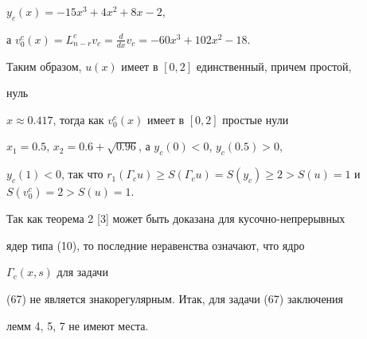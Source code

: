 $y_c(x)=-15x^3+4x^2+8x-2$, 


а $v^c_0(x)=L^c_{n-r}v_c=\frac{d}{dx}v_c=-60x^3+102x^2-18$. 


Таким образом, $u(x)$ имеет в $[0,2]$ единственный, причем простой, 


нуль 


$x\approx0.417$, тогда как $v^c_0(x)$ имеет в $[0,2]$ простые нули 


$x_1=0.5$, $x_2=0.6+\sqrt{0.96}$, а $y_c(0)<0$, $y_c(0.5)>0$, 


$y_c(1)<0$, так что $r_1(\Gamma_c u)\ge S(\Gamma_c u)=S(y_c)\ge 


2>S(u)=1$ и $S(v^c_0)=2>S(u)=1$. 


Так как теорема 2 [3] может быть доказана для кусочно-непрерывных 


ядер типа (10), то последние неравенства означают, что ядро 


$\Gamma_c(x,s)$ для задачи 


(67) не является знакорегулярным. Итак, для задачи (67) заключения 


лемм 4, 5, 7 не имеют места. 


 


